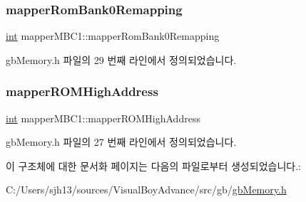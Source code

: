 \subsubsection{\texorpdfstring{mapper\+Rom\+Bank0\+Remapping}{mapperRomBank0Remapping}}
{\footnotesize\ttfamily \mbox{\hyperlink{_util_8cpp_a0ef32aa8672df19503a49fab2d0c8071}{int}} mapper\+M\+B\+C1\+::mapper\+Rom\+Bank0\+Remapping}



gb\+Memory.\+h 파일의 29 번째 라인에서 정의되었습니다.

\mbox{\label{structmapper_m_b_c1_a3f67a98b1f2e81822fb700afeb9cbbe6}} 
\subsubsection{\texorpdfstring{mapper\+R\+O\+M\+High\+Address}{mapperROMHighAddress}}
{\footnotesize\ttfamily \mbox{\hyperlink{_util_8cpp_a0ef32aa8672df19503a49fab2d0c8071}{int}} mapper\+M\+B\+C1\+::mapper\+R\+O\+M\+High\+Address}



gb\+Memory.\+h 파일의 27 번째 라인에서 정의되었습니다.



이 구조체에 대한 문서화 페이지는 다음의 파일로부터 생성되었습니다.\+:\begin{DoxyCompactItemize}
\item 
C\+:/\+Users/sjh13/sources/\+Visual\+Boy\+Advance/src/gb/\mbox{\hyperlink{gb_memory_8h}{gb\+Memory.\+h}}\end{DoxyCompactItemize}
